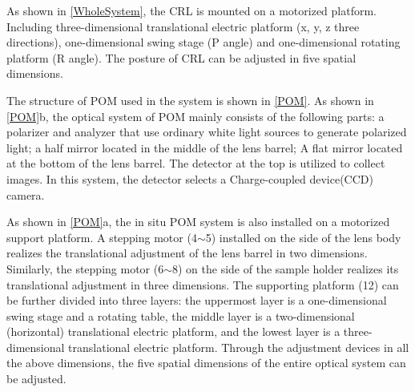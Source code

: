 \documentclass{Head}
\begin{document}
As shown in \autoref{WholeSystem}, the CRL is mounted on a motorized platform. Including three-dimensional translational electric platform (x, y, z three directions), one-dimensional swing stage (P angle) and one-dimensional rotating platform (R angle). The posture of CRL can be adjusted in five spatial dimensions.


The structure of POM used in the system is shown in \autoref{POM}.
As shown in \autoref{POM}b, the optical system of POM mainly consists of the following parts: a polarizer and analyzer that use ordinary white light sources to generate polarized light; a half mirror located in the middle of the lens barrel; A flat mirror located at the bottom of the lens barrel. The detector at the top is utilized to collect images. In this system, the detector selects a Charge-coupled device(CCD) camera.


As shown in \autoref{POM}a, the in situ POM system is also installed on a motorized support platform.
A stepping motor (4$\sim$5) installed on the side of the lens body realizes the translational adjustment of the lens barrel in two dimensions.
Similarly, the stepping motor (6$\sim$8) on the side of the sample holder realizes its translational adjustment in three dimensions.
The supporting platform (12) can be further divided into three layers: the uppermost layer is a one-dimensional swing stage and a rotating table, the middle layer is a two-dimensional (horizontal) translational electric platform, and the lowest layer is a three-dimensional translational electric platform.
Through the adjustment devices in all the above dimensions, the five spatial dimensions of the entire optical system can be adjusted.
\end{document}
